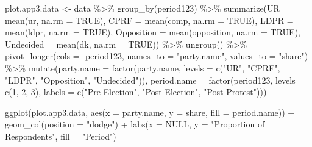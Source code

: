 \documentclass[
  letterpaper,
  DIV=11,
  numbers=noendperiod]{scrartcl}
\newenvironment{Shaded}{\begin{snugshade}}{\end{snugshade}}
\newcommand{\AttributeTok}[1]{\textcolor[rgb]{0.40,0.45,0.13}{#1}}
\newcommand{\ConstantTok}[1]{\textcolor[rgb]{0.56,0.35,0.01}{#1}}
\newcommand{\DecValTok}[1]{\textcolor[rgb]{0.68,0.00,0.00}{#1}}
\newcommand{\FunctionTok}[1]{\textcolor[rgb]{0.28,0.35,0.67}{#1}}
\newcommand{\NormalTok}[1]{\textcolor[rgb]{0.00,0.23,0.31}{#1}}
\newcommand{\OtherTok}[1]{\textcolor[rgb]{0.00,0.23,0.31}{#1}}
\newcommand{\SpecialCharTok}[1]{\textcolor[rgb]{0.37,0.37,0.37}{#1}}
\newcommand{\StringTok}[1]{\textcolor[rgb]{0.13,0.47,0.30}{#1}}
\begin{document}
\begin{Shaded}
\begin{Highlighting}[]
\NormalTok{plot.app3.data }\OtherTok{\textless{}{-}}\NormalTok{ data }\SpecialCharTok{\%\textgreater{}\%}
  \FunctionTok{group\_by}\NormalTok{(period123) }\SpecialCharTok{\%\textgreater{}\%}
  \FunctionTok{summarize}\NormalTok{(}\AttributeTok{UR =} \FunctionTok{mean}\NormalTok{(ur, }\AttributeTok{na.rm =} \ConstantTok{TRUE}\NormalTok{), }
            \AttributeTok{CPRF =} \FunctionTok{mean}\NormalTok{(comp, }\AttributeTok{na.rm =} \ConstantTok{TRUE}\NormalTok{),}
            \AttributeTok{LDPR =} \FunctionTok{mean}\NormalTok{(ldpr, }\AttributeTok{na.rm =} \ConstantTok{TRUE}\NormalTok{), }
            \AttributeTok{Opposition =} \FunctionTok{mean}\NormalTok{(opposition, }\AttributeTok{na.rm =} \ConstantTok{TRUE}\NormalTok{),}
            \AttributeTok{Undecided  =} \FunctionTok{mean}\NormalTok{(dk, }\AttributeTok{na.rm =} \ConstantTok{TRUE}\NormalTok{)) }\SpecialCharTok{\%\textgreater{}\%}
  \FunctionTok{ungroup}\NormalTok{() }\SpecialCharTok{\%\textgreater{}\%} 
  \FunctionTok{pivot\_longer}\NormalTok{(}\AttributeTok{cols =} \SpecialCharTok{{-}}\NormalTok{period123, }\AttributeTok{names\_to =} \StringTok{"party.name"}\NormalTok{, }\AttributeTok{values\_to =} \StringTok{"share"}\NormalTok{) }\SpecialCharTok{\%\textgreater{}\%}
  \FunctionTok{mutate}\NormalTok{(}\AttributeTok{party.name =} \FunctionTok{factor}\NormalTok{(party.name, }
                             \AttributeTok{levels =} \FunctionTok{c}\NormalTok{(}\StringTok{"UR"}\NormalTok{, }\StringTok{"CPRF"}\NormalTok{, }\StringTok{"LDPR"}\NormalTok{, }\StringTok{"Opposition"}\NormalTok{, }\StringTok{"Undecided"}\NormalTok{)),}
         \AttributeTok{period.name =} \FunctionTok{factor}\NormalTok{(period123, }\AttributeTok{levels =} \FunctionTok{c}\NormalTok{(}\DecValTok{1}\NormalTok{, }\DecValTok{2}\NormalTok{, }\DecValTok{3}\NormalTok{),}
                              \AttributeTok{labels =} \FunctionTok{c}\NormalTok{(}\StringTok{"Pre{-}Election"}\NormalTok{, }\StringTok{"Post{-}Election"}\NormalTok{, }\StringTok{"Post{-}Protest"}\NormalTok{)))}

\FunctionTok{ggplot}\NormalTok{(plot.app3.data, }\FunctionTok{aes}\NormalTok{(}\AttributeTok{x =}\NormalTok{ party.name, }\AttributeTok{y =}\NormalTok{ share, }\AttributeTok{fill =}\NormalTok{ period.name)) }\SpecialCharTok{+}
  \FunctionTok{geom\_col}\NormalTok{(}\AttributeTok{position =} \StringTok{"dodge"}\NormalTok{) }\SpecialCharTok{+}
  \FunctionTok{labs}\NormalTok{(}\AttributeTok{x =} \ConstantTok{NULL}\NormalTok{, }\AttributeTok{y =} \StringTok{"Proportion of Respondents"}\NormalTok{, }\AttributeTok{fill =} \StringTok{"Period"}\NormalTok{)}
\end{Highlighting}
\end{Shaded}
\end{document}
